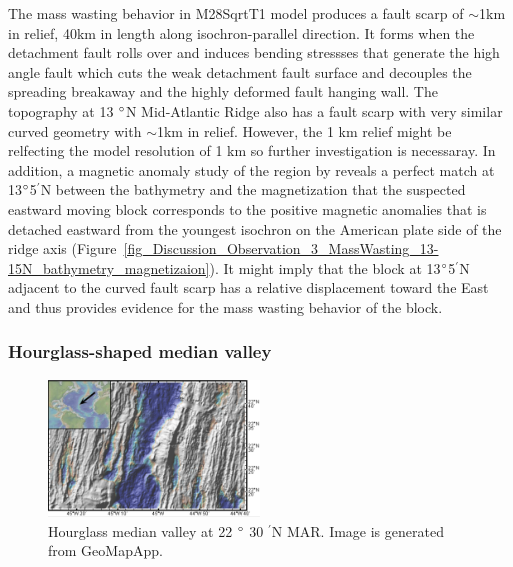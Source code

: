 The mass wasting behavior in M28SqrtT1 model produces a fault scarp of $\sim$1km in relief, 40km in length along isochron-parallel direction. It forms when the detachment fault rolls over and induces bending stressses that generate the high angle fault which cuts the weak detachment fault surface and decouples the spreading breakaway and the highly deformed fault hanging wall. The topography at 13 $\degree$N Mid-Atlantic Ridge also has a fault scarp with very similar curved geometry with $\sim$1km in relief. However, the 1 km relief might be relfecting the model resolution of 1 km so further investigation is necessaray. In addition, a magnetic anomaly study of the region by \citep{Smith2008} reveals a perfect match at 13$\degree$5$^{\prime}$N between the bathymetry and the magnetization that the suspected eastward moving block corresponds to the positive magnetic anomalies that is detached eastward from the youngest isochron on the American plate side of the ridge axis (Figure~\hyperref[fig_Discussion_Observation_3_MassWasting_13-15N_bathymetry_magnetizaion]{\ref{fig_Discussion_Observation_3_MassWasting_13-15N_bathymetry_magnetizaion}}). It might imply that the block at 13$\degree$5$^{\prime}$N adjacent to the curved fault scarp has a relative displacement toward the East and thus provides evidence for the mass wasting behavior of the block.   
 
\subsubsection{Hourglass-shaped median valley}

\begin{figure}[h]
  \centering
    \includegraphics[width=0.5\textwidth]{./Figures/fig_Discussion_Observation_4_hourglass_22N_MAR.eps}
  \caption[Hourglass median valley at 22 $\degree$ 30 $^{\prime}$N MAR.]{Hourglass median valley at 22 $\degree$ 30 $^{\prime}$N MAR. Image is generated from GeoMapApp.}
 \label{fig_Discussion_Observation_4_hourglass_22N_MAR}
\end{figure}   

